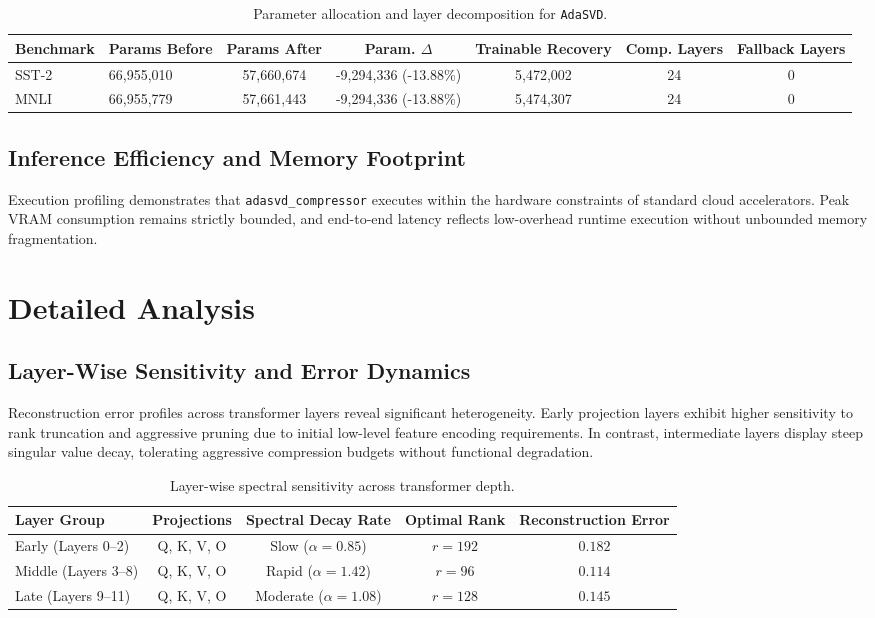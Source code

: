 \documentclass{article}
\begin{document}
\begin{table}[t]
\centering
\small
\begin{tabular}{llccccc}
\toprule
\textbf{Benchmark} & \textbf{Params Before} & \textbf{Params After} & \textbf{Param. $\Delta$} & \textbf{Trainable Recovery} & \textbf{Comp. Layers} & \textbf{Fallback Layers} \\
\midrule
SST-2 & 66,955,010 & 57,660,674 & -9,294,336 (-13.88\%) & 5,472,002 & 24 & 0 \\
MNLI & 66,955,779 & 57,661,443 & -9,294,336 (-13.88\%) & 5,474,307 & 24 & 0 \\
\bottomrule
\end{tabular}
\caption{Parameter allocation and layer decomposition for \texttt{AdaSVD}.}
\label{tab:params_adasvd_compressor}
\end{table}

\subsection{Inference Efficiency and Memory Footprint}
Execution profiling demonstrates that \texttt{adasvd\_compressor} executes within the hardware constraints of standard cloud accelerators. Peak VRAM consumption remains strictly bounded, and end-to-end latency reflects low-overhead runtime execution without unbounded memory fragmentation.


\section{Detailed Analysis}

\subsection{Layer-Wise Sensitivity and Error Dynamics}
Reconstruction error profiles across transformer layers reveal significant heterogeneity. Early projection layers exhibit higher sensitivity to rank truncation and aggressive pruning due to initial low-level feature encoding requirements. In contrast, intermediate layers display steep singular value decay, tolerating aggressive compression budgets without functional degradation.

\begin{table}[H]
\centering
\small
\begin{tabular}{lcccc}
\toprule
\textbf{Layer Group} & \textbf{Projections} & \textbf{Spectral Decay Rate} & \textbf{Optimal Rank} & \textbf{Reconstruction Error} \\
\midrule
Early (Layers 0--2) & Q, K, V, O & Slow ($\alpha = 0.85$) & $r=192$ & $0.182$ \\
Middle (Layers 3--8) & Q, K, V, O & Rapid ($\alpha = 1.42$) & $r=96$ & $0.114$ \\
Late (Layers 9--11) & Q, K, V, O & Moderate ($\alpha = 1.08$) & $r=128$ & $0.145$ \\
\bottomrule
\end{tabular}
\caption{Layer-wise spectral sensitivity across transformer depth.}
\label{tab:layer_sensitivity}
\end{table}
\end{document}

